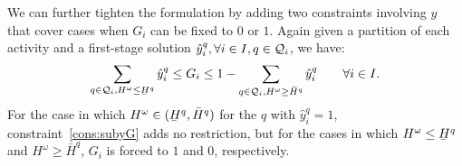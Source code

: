 \documentclass[11pt]{article}
\newcommand{\cQ}{{\cal Q}}
\renewcommand{\underbar}{\underaccent{\bar}}
\newcommand{\tcr}{\textcolor{red}}
\begin{document}
We can further tighten the formulation by adding two constraints involving \(y\) that cover cases when \(G_i\) can be fixed to \(0\) or \(1\). Again given a partition of each activity and a first-stage solution \(\hat{y}_i^q, \forall i \in I, q \in \cQ_i\), we have:
		\begin{equation}\label{cons:subyG}
			\sum_{q \in \cQ_i, H^\omega {\leq} \underbar{H}^q} \hat{y}_i^q \leq G_i \leq 1 - \sum_{q \in \cQ_i, H^\omega {\geq} \bar{H}^q} \hat{y}_i^q \qquad \forall i \in I.
		\end{equation}
\tcr{
}
{For the case in which \(H^\omega \in (\underbar{H}^q,\bar{H}^q)\) for the $q$ with $\hat{y}_i^q=1$, constraint~\eqref{cons:subyG} adds no restriction, but for the cases in which \(H^\omega \le \underbar{H}^q\) and \(H^\omega \ge \bar{H}^q\), $G_i$ is forced to $1$ and $0$, respectively.}
\end{document}
